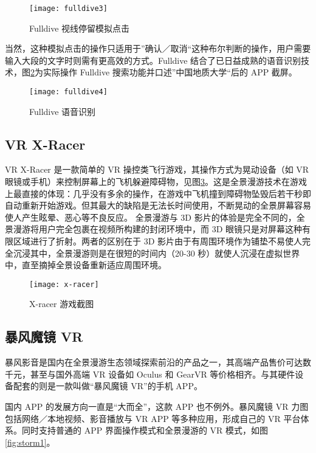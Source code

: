 \begin{figure}[htp]
\centering
\texttt{[image: fulldive3]}
\caption{Fulldive 视线停留模拟点击}
\label{fig:fulldive3}
\end{figure}

当然，这种模拟点击的操作只适用于”确认／取消“这种布尔判断的操作，用户需要输入大段的文字时则需有更高效的方式。Fulldive 结合了已日益成熟的语音识别技术，图\ref{fig:fulldive4}为实际操作 Fulldive 搜索功能并口述”中国地质大学“后的 APP 截屏。

\begin{figure}[htp]
\centering
\texttt{[image: fulldive4]}
\caption{Fulldive 语音识别}
\label{fig:fulldive4}
\end{figure}

\subsection{VR X-Racer}

VR X-Racer 是一款简单的 VR 操控类飞行游戏，其操作方式为晃动设备（如 VR 眼镜或手机）来控制屏幕上的飞机躲避障碍物，见图\ref{fig:x-racer}。这是全景漫游技术在游戏上最直接的体现：几乎没有多余的操作，在游戏中飞机撞到障碍物坠毁后若干秒即自动重新开始游戏。但其最大的缺陷是无法长时间使用，不断晃动的全景屏幕容易使人产生眩晕、恶心等不良反应。
全景漫游与 3D 影片的体验是完全不同的，全景漫游将用户完全包裹在视频所构建的封闭环境中，而 3D 眼镜只是对屏幕这种有限区域进行了折射。两者的区别在于 3D 影片由于有周围环境作为铺垫不易使人完全沉浸其中，全景漫游则是在很短的时间内（20-30 秒）就使人沉浸在虚拟世界中，直至摘掉全景设备重新适应周围环境。

\begin{figure}[htp]
\centering
\texttt{[image: x-racer]}
\caption{X-racer 游戏截图}
\label{fig:x-racer}
\end{figure}

\subsection{暴风魔镜 VR}

暴风影音是国内在全景漫游生态领域探索前沿的产品之一，其高端产品售价可达数千元，甚至与国外高端 VR 设备如 Oculus 和 GearVR 等价格相齐。与其硬件设备配套的则是一款叫做“暴风魔镜 VR”的手机 APP。

国内 APP 的发展方向一直是“大而全”，这款 APP 也不例外。暴风魔镜 VR 力图包括网络／本地视频、影音播放与 VR APP 等多种应用，形成自己的 VR 平台体系。同时支持普通的 APP 界面操作模式和全景漫游的 VR 模式，如图\ref{fig:storm1}。

